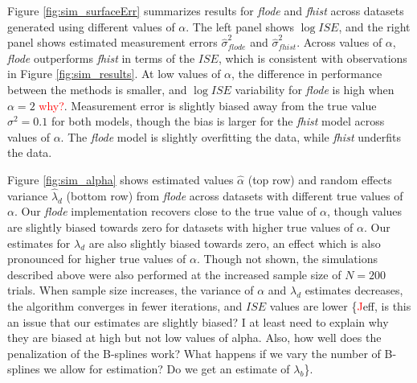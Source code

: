 \documentclass[preprint]{JASA}
\begin{document}
Figure \ref{fig:sim_surfaceErr} summarizes results for \emph{flode} and
\emph{fhist} across datasets generated using different values of
\(\alpha\). The left panel shows \(\log ISE\), and the right panel shows
estimated measurement errors \(\widehat{\sigma}^2_{flode}\) and
\(\widehat{\sigma}^2_{fhist}\). Across values of \(\alpha\),
\emph{flode} outperforms \emph{fhist} in terms of the \(ISE\), which is
consistent with observations in Figure \ref{fig:sim_results}. At low
values of \(\alpha\), the difference in performance between the methods
is smaller, and \(\log ISE\) variability for \emph{flode} is high when
\(\alpha = 2\) \textcolor{red}{why?}. Measurement error is slightly
biased away from the true value \(\sigma^2 = 0.1\) for both models,
though the bias is larger for the \emph{fhist} model across values of
\(\alpha\). The \emph{flode} model is slightly overfitting the data,
while \emph{fhist} underfits the data.

Figure \ref{fig:sim_alpha} shows estimated values \(\widehat{\alpha}\)
(top row) and random effects variance \(\widehat{\lambda}_d\) (bottom
row) from \emph{flode} across datasets with different true values of
\(\alpha\). Our \emph{flode} implementation recovers close to the true
value of \(\alpha\), though values are slightly biased towards zero for
datasets with higher true values of \(\alpha\). Our estimates for
\(\lambda_d\) are also slightly biased towards zero, an effect which is
also pronounced for higher true values of \(\alpha\). Though not shown,
the simulations described above were also performed at the increased
sample size of \(N = 200\) trials. When sample size increases, the
variance of \(\alpha\) and \(\lambda_d\) estimates decreases, the
algorithm converges in fewer iterations, and \(ISE\) values are lower
\{\textcolor{red} Jeff, is this an issue that our estimates are slightly
biased? I at least need to explain why they are biased at high but not
low values of alpha. Also, how well does the penalization of the
B-splines work? What happens if we vary the number of B-splines we allow
for estimation? Do we get an estimate of \(\lambda_b\)\}.
\end{document}
